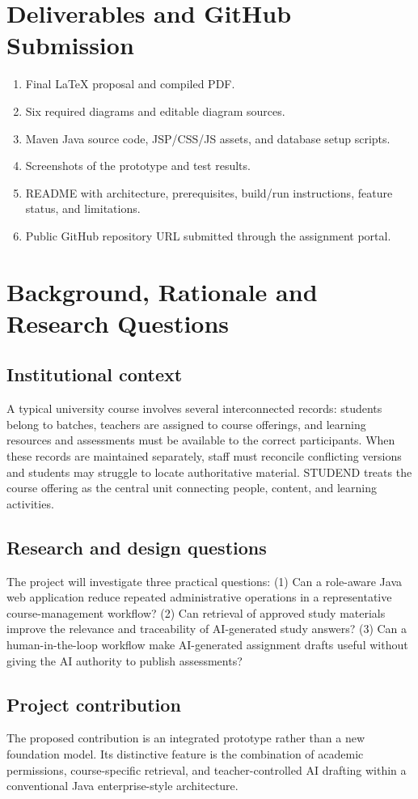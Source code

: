 \documentclass[11pt,a4paper]{article}
\begin{document}
\section{Deliverables and GitHub Submission}
\begin{enumerate}[leftmargin=*]\item Final LaTeX proposal and compiled PDF.\item Six required diagrams and editable diagram sources.\item Maven Java source code, JSP/CSS/JS assets, and database setup scripts.\item Screenshots of the prototype and test results.\item README with architecture, prerequisites, build/run instructions, feature status, and limitations.\item Public GitHub repository URL submitted through the assignment portal.\end{enumerate}

\clearpage
\section{Background, Rationale and Research Questions}
\subsection{Institutional context}
A typical university course involves several interconnected records: students belong to batches, teachers are assigned to course offerings, and learning resources and assessments must be available to the correct participants. When these records are maintained separately, staff must reconcile conflicting versions and students may struggle to locate authoritative material. STUDEND treats the course offering as the central unit connecting people, content, and learning activities.
\subsection{Research and design questions}
The project will investigate three practical questions: (1) Can a role-aware Java web application reduce repeated administrative operations in a representative course-management workflow? (2) Can retrieval of approved study materials improve the relevance and traceability of AI-generated study answers? (3) Can a human-in-the-loop workflow make AI-generated assignment drafts useful without giving the AI authority to publish assessments?
\subsection{Project contribution}
The proposed contribution is an integrated prototype rather than a new foundation model. Its distinctive feature is the combination of academic permissions, course-specific retrieval, and teacher-controlled AI drafting within a conventional Java enterprise-style architecture.
\end{document}

